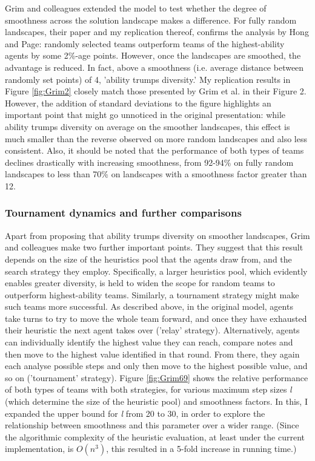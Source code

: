  Grim and colleagues extended the model to test whether the degree of smoothness across the solution landscape makes a difference. For fully random landscapes, their paper and my replication thereof, confirms the analysis by Hong and Page: randomly selected teams outperform teams of the highest-ability agents by some 2\%-age points. However, once the landscapes are smoothed, the advantage is reduced. In fact, above a smoothness (i.e. average distance between randomly set points) of 4, 'ability trumps diversity.' My replication results in Figure \ref{fig:Grim2} closely match those presented by Grim et al. in their Figure 2. However, the addition of standard deviations to the figure highlights an important point that might go unnoticed in the original presentation: while ability trumps diversity on average on the smoother landscapes, this effect is much smaller than the reverse observed on more random landscapes and also less consistent. Also, it should be noted that the performance of both types of teams declines drastically with increasing smoothness, from 92-94\% on fully random landscapes to less than 70\% on landscapes with a smoothness factor greater than 12.
 
 \subsubsection{Tournament dynamics and further comparisons}
 
 Apart from proposing that ability trumps diversity on smoother landscapes, Grim and colleagues make two further important points. They suggest that this result depends on the size of the heuristics pool that the agents draw from, and the search strategy they employ. Specifically, a larger heuristics pool, which evidently enables greater diversity, is held to widen the scope for random teams to outperform highest-ability teams. Similarly, a tournament strategy might make such teams more successful. As described above, in the original model, agents take turns to try to move the whole team forward, and once they have exhausted their heuristic the next agent takes over ('relay' strategy). Alternatively, agents can individually identify the highest value they can reach, compare notes and then move to the highest value identified in that round. From there, they again each analyse possible steps and only then move to the highest possible value, and so on ('tournament' strategy). Figure \ref{fig:Grim69} shows the relative performance of both types of teams with both strategies, for various maximum step sizes \textit{l} (which determine the size of the heuristic pool) and smoothness factors. In this, I expanded the upper bound for \textit{l} from 20 to 30, in order to explore the relationship between smoothness and this parameter over a wider range. (Since the algorithmic complexity of the heuristic evaluation, at least under the current implementation, is $O(n^3)$, this resulted in a 5-fold increase in running time.) \\

